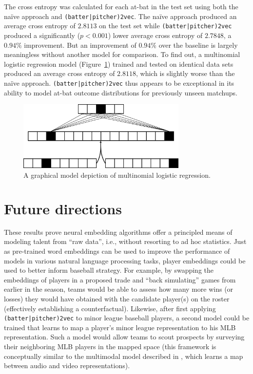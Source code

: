\documentclass{article}
\begin{document}
The cross entropy was calculated for each at-bat in the test set using both the naïve approach and \texttt{(batter|pitcher)2vec}. The naïve approach produced an average cross entropy of $2.8113$ on the test set while \texttt{(batter|pitcher)2vec} produced a significantly ($p < 0.001$) lower average cross entropy of $2.7848$, a $0.94\%$ improvement. But an improvement of $0.94\%$ over the baseline is largely meaningless without another model for comparison. To find out, a multinomial logistic regression model (Figure~\ref{fig:log_reg}) trained and tested on identical data sets produced an average cross entropy of $2.8118$, which is slightly worse than the naïve approach. \texttt{(batter|pitcher)2vec} thus appears to be exceptional in its ability to model at-bat outcome distributions for previously unseen matchups.

\begin{figure}[h]
\centering
\includegraphics[width=0.75\textwidth,height=\textheight,keepaspectratio]{logistic_regression.png}
\caption{A graphical model depiction of multinomial logistic regression.}
\label{fig:log_reg}
\end{figure}

\section{Future directions}
\label{future}

These results prove neural embedding algorithms offer a principled means of modeling talent from ``raw data'', i.e., without resorting to ad hoc statistics. Just as pre-trained word embeddings can be used to improve the performance of models in various natural language processing tasks, player embeddings could be used to better inform baseball strategy. For example, by swapping the embeddings of players in a proposed trade and ``back simulating'' games from earlier in the season, teams would be able to assess how many more wins (or losses) they would have obtained with the candidate player(s) on the roster (effectively establishing a counterfactual). Likewise, after first applying \texttt{(batter|pitcher)2vec} to minor league baseball players, a second model could be trained that learns to map a player's minor league representation to his MLB representation. Such a model would allow teams to scout prospects by surveying their neighboring MLB players in the mapped space (this framework is conceptually similar to the multimodal model described in \parencite{Ngiam2011}, which learns a map between audio and video representations). 
\end{document}
